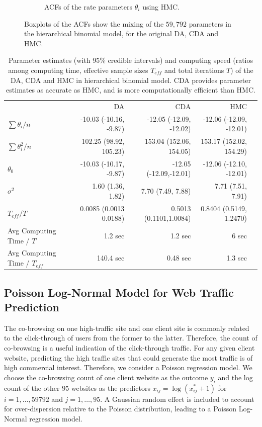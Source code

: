 \documentclass[12pt]{article}
\begin{document}
\begin{figure}[H]
\begin{subfigure}[b]{0.32\textwidth}
 \caption{ACFs of the rate parameters $\theta_i$ using HMC.}
 \end{subfigure} 
 \caption{Boxplots of the ACFs show the mixing of the $59,792$ parameters in the hierarchical binomial model, for the original DA\citep{polson2013bayesian}, CDA and HMC.}
 \label{data_binomial}
 \end{figure}
 
 
 
\begin{table}[H]
\small
\centering
\begin{tabular}{|l |r |r| r| r |} 
 \hline
                          & DA & CDA & HMC\\
 [0.5ex]

 $ \sum \theta_i/n$      & -10.03 (-10.16, -9.87)& -12.05 (-12.09, -12.02) &  -12.06 (-12.09, -12.01)\\
 $ \sum \theta_i^2/n$      & 102.25 (98.92, 105.23)& 153.04 (152.06, 154.05) &  153.17 (152.02, 154.29)\\
$\theta_0$          & -10.03 (-10.17, -9.87)& -12.05 (-12.09,-12.01) &  -12.06 (-12.10, -12.01)\\
$\sigma^2$         & 1.60 (1.36, 1.82)&   7.70 (7.49, 7.88)  & 7.71 (7.51, 7.91)\\
$T_{eff} / T$ & 0.0085 (0.0013 0.0188) & 0.5013 (0.1101,1.0084) & 0.8404 (0.5149, 1.2470)\\
Avg Computing Time /  $T$  & 1.2 sec       & 1.2 sec        & 6 sec\\
Avg Computing Time /  $T_{eff}$  & 140.4 sec       & 0.48 sec        & 1.3 sec\\
 \hline
\end{tabular}
\caption{Parameter estimates (with 95\% credible intervals) and computing speed (ratios among computing time, effective sample sizes $T_{eff}$ and total iterations $T$) of the DA, CDA and HMC in hierarchical binomial model. CDA provides parameter estimates as accurate as HMC, and is more computationally efficient than HMC.}
\label{tab:binomial}
\end{table}


\subsection{Poisson Log-Normal Model for Web Traffic Prediction}

The co-browsing on one high-traffic site and one client site is commonly related to the click-through of users from the former to the latter. Therefore, the count of co-browsing is a useful indication of the click-through traffic. For any given client website, predicting the high traffic sites that could generate the most traffic is of high commercial interest. Therefore, we consider a Poisson regression model. We choose the co-browsing count of one client website as the outcome $y_i$ and the log count of the other $95$ websites as the predictors $x_{ij}=\log (x^*_{ij}+1)$ for $i=1,\ldots ,59792$ and $j=1,\ldots ,95$.  A Gaussian random effect is included to account for over-dispersion relative to the Poisson distribution, leading to a Poisson Log-Normal regression model. 
\end{document}
